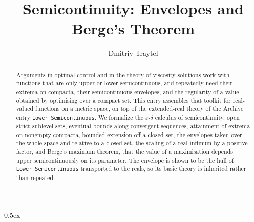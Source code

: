 \documentclass[11pt,a4paper]{article}
\begin{document}
\title{Semicontinuity: Envelopes and Berge's Theorem}
\author{Dmitriy Traytel}
\maketitle

\begin{abstract}
  Arguments in optimal control and in the theory of viscosity solutions work
  with functions that are only upper or lower semicontinuous, and repeatedly
  need their extrema on compacta, their semicontinuous envelopes, and the
  regularity of a value obtained by optimising over a compact set.  This
  entry assembles that toolkit for real-valued functions on a metric space,
  on top of the extended-real theory of the Archive entry
  \texttt{Lower\_Semicontinuous}.  We formalize the
  $\varepsilon$-$\delta$ calculus of semicontinuity, open strict sublevel
  sets, eventual bounds along convergent sequences, attainment of extrema on
  nonempty compacta, bounded extension off a closed set, the envelopes taken
  over the whole space and relative to a closed set, the scaling of a real
  infimum by a positive factor, and Berge's maximum
  theorem, that the value of a maximisation depends upper semicontinuously on
  its parameter.  The envelope is shown to be the hull of
  \texttt{Lower\_Semicontinuous} transported to the reals, so its basic
  theory is inherited rather than repeated.
\end{abstract}

\tableofcontents

\parindent 0pt\parskip 0.5ex





\end{document}
